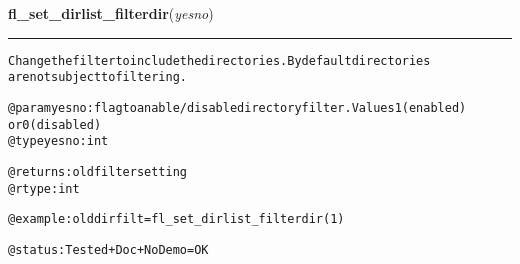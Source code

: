     \label{xformslib:flfilesys:fl_set_dirlist_filterdir}

    \vspace{0.5ex}

\hspace{.8\funcindent}\begin{boxedminipage}{\funcwidth}

    \raggedright \textbf{fl\_set\_dirlist\_filterdir}(\textit{yesno})

    \vspace{-1.5ex}

    \rule{\textwidth}{0.5\fboxrule}
\setlength{\parskip}{2ex}
\begin{alltt}
Change the filter to include the directories. By default directories
 are not subject to filtering.

@param yesno: flag to anable/disable directory filter. Values 1 (enabled)
    or 0 (disabled)
@type yesno: int

@returns: old filter setting
@rtype: int

@example: olddirfilt = fl\_set\_dirlist\_filterdir(1)

@status: Tested + Doc + NoDemo = OK
\end{alltt}

\setlength{\parskip}{1ex}
    \end{boxedminipage}

    \label{xformslib:flfilesys:fl_free_dirlist}

    \vspace{0.5ex}

